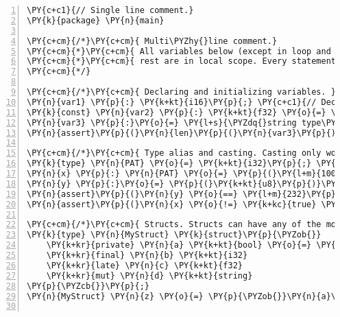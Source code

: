 \begin{Verbatim}[commandchars=\\\{\},numbers=left,firstnumber=1,stepnumber=1]
\PY{c+c1}{// Single line comment.}
\PY{k}{package} \PY{n}{main}

\PY{c+cm}{/*}\PY{c+cm}{ Multi\PYZhy{}line comment.}
\PY{c+cm}{*}\PY{c+cm}{ All variables below (except in loop and function body) are in global scope. The}
\PY{c+cm}{*}\PY{c+cm}{ rest are in local scope. Every statement of code must end in a semicolon.}
\PY{c+cm}{*/}

\PY{c+cm}{/*}\PY{c+cm}{ Declaring and initializing variables. }\PY{c+cm}{*/}
\PY{n}{var1} \PY{p}{:} \PY{k+kt}{i16}\PY{p}{;} \PY{c+c1}{// Declared vars. must specify type}
\PY{k}{const} \PY{n}{var2} \PY{p}{:} \PY{k+kt}{f32} \PY{o}{=} \PY{p}{(}\PY{o}{\PYZhy{}}\PY{l+m}{1.50}\PY{n}{f}\PY{p}{)}\PY{p}{;} \PY{c+c1}{// Constant var init. Negatives must be wrapped in ().}
\PY{n}{var3} \PY{p}{:}\PY{o}{=} \PY{l+s}{\PYZdq{}string type\PYZdq{}}\PY{p}{;} \PY{c+c1}{// Walrus operator infers type from right hand side.}
\PY{n}{assert}\PY{p}{(}\PY{n}{len}\PY{p}{(}\PY{n}{var3}\PY{p}{)} \PY{o}{==} \PY{l+m}{11}\PY{p}{)}\PY{p}{;} \PY{c+c1}{// len(.) gets length of string.}

\PY{c+cm}{/*}\PY{c+cm}{ Type alias and casting. Casting only works b}\PY{c+cm}{/}\PY{c+cm}{t primitives. See LRM. }\PY{c+cm}{*/}
\PY{k}{type} \PY{n}{PAT} \PY{o}{=} \PY{k+kt}{i32}\PY{p}{;} \PY{c+c1}{// Type alias for signed 32\PYZhy{}bit int.}
\PY{n}{x} \PY{p}{:} \PY{n}{PAT} \PY{o}{=} \PY{p}{(}\PY{l+m}{100} \PY{o}{*} \PY{l+m}{10}\PY{p}{)} \PY{o}{+} \PY{l+m}{1}\PY{p}{;}
\PY{n}{y} \PY{p}{:}\PY{o}{=} \PY{p}{(}\PY{k+kt}{u8}\PY{p}{)}\PY{n}{x}\PY{p}{;} \PY{c+c1}{// Casting. Signed 32\PYZhy{}bit int \PYZhy{}\PYZhy{}\PYZgt{} unsigned 8\PYZhy{}bit int.}
\PY{n}{assert}\PY{p}{(}\PY{n}{y} \PY{o}{==} \PY{l+m}{232}\PY{p}{)}\PY{p}{;} \PY{c+c1}{// Due to truncation.}
\PY{n}{assert}\PY{p}{(}\PY{n}{x} \PY{o}{!=} \PY{k+kc}{true} \PY{o}{\PYZam{}\PYZam{}} \PY{k+kt}{bool}\PY{p}{(}\PY{n}{x}\PY{p}{)} \PY{o}{==} \PY{k+kc}{true}\PY{p}{)}\PY{p}{;} \PY{c+c1}{// Only bool types can be true or false.}

\PY{c+cm}{/*}\PY{c+cm}{ Structs. Structs can have any of the modifiers shown below. See LRM. }\PY{c+cm}{*/}
\PY{k}{type} \PY{n}{MyStruct} \PY{k}{struct}\PY{p}{\PYZob{}}
    \PY{k+kr}{private} \PY{n}{a} \PY{k+kt}{bool} \PY{o}{=} \PY{k+kc}{false} \PY{c+c1}{// Can initialize value.}
    \PY{k+kr}{final} \PY{n}{b} \PY{k+kt}{i32}
    \PY{k+kr}{late} \PY{n}{c} \PY{k+kt}{f32}
    \PY{k+kr}{mut} \PY{n}{d} \PY{k+kt}{string}
\PY{p}{\PYZcb{}}\PY{p}{;}
\PY{n}{MyStruct} \PY{n}{z} \PY{o}{=} \PY{p}{\PYZob{}}\PY{n}{a}\PY{p}{:}\PY{k+kc}{true}\PY{p}{,} \PY{n}{b}\PY{p}{:}\PY{l+m}{123}\PY{p}{,} \PY{n}{c}\PY{p}{:}\PY{l+m}{4.56}\PY{p}{,} \PY{n}{d}\PY{p}{:}\PY{l+s}{\PYZdq{}false\PYZdq{}}\PY{p}{\PYZcb{}}\PY{p}{;}


\end{Verbatim}
